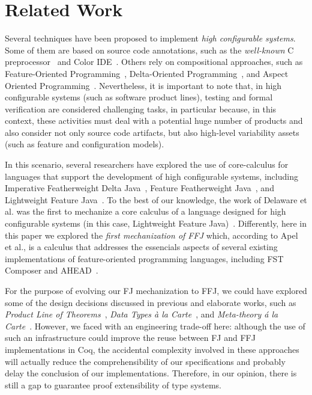 \chapter{Related Work}\label{seq:related}

Several techniques have been proposed to implement
\emph{high configurable systems}. Some of
them are based on source code annotations, such as
the \emph{well-known} C preprocessor~\cite{stallman:cpp} and Color IDE~\cite{kastner:icse2008}. Others
rely on compositional approaches, such as
Feature-Oriented Programming~\cite{batory-tse2004,batory_feature-oriented_2004},
Delta-Oriented Programming~\cite{schaefer_delta-oriented_2010}, 
and Aspect Oriented Programming~\cite{kiczales:ecoop2001,alves:splc2005}.
Nevertheless, it is important to
note that, in high configurable systems (such as software
product lines), testing and formal verification are considered
challenging tasks, in particular because, in this context,
these activities must deal with a potential huge number of
products and also consider not only source code artifacts,
but also high-level variability assets (such as feature and
configuration models).

In this scenario, several researchers have explored
the use of core-calculus for languages that
support the development of high configurable systems,
including Imperative Featherweight Delta Java~\cite{schaefer:aosd2011}, Feature
Featherweight Java~\cite{apel_feature_2008}, and Lightweight Feature Java~\cite{delaware:fse-2009}.
To the best of our knowledge, the work of Delaware
et al. was the first to mechanize a core calculus
of a language designed for high configurable systems (in
this case, Lightweight Feature Java)~\cite{delaware:fse-2009}. Differently, here in
this paper we explored the \emph{first mechanization of \gls{FFJ}}
which, according to Apel et al., is a calculus that
addresses the essencials aspects of several
existing implementations of feature-oriented programming
languages, including FST Composer and AHEAD~\cite{apel_feature_2008}. 

For the purpose of evolving our \gls{FJ} mechanization
to \gls{FFJ}, we could have explored some of the
design decisions discussed in previous and elaborate works, such as
\emph{Product Line of Theorems}~\cite{delaware:oopsla2011},
\emph{Data Types \`{a} la Carte}~\cite{swierstra_2008},
and \emph{Meta-theory \'{a} la Carte}~\cite{delaware:popl2013}.
However, we faced with
an engineering trade-off here: although the use of such an
infrastructure could improve the reuse between \gls{FJ} and \gls{FFJ}
implementations in Coq, the accidental complexity involved in
these approaches will actually reduce the comprehensibility of our
specifications and probably delay the conclusion of our
implementations. Therefore, in our opinion, there is still a
gap to guarantee proof extensibility of type systems. 
